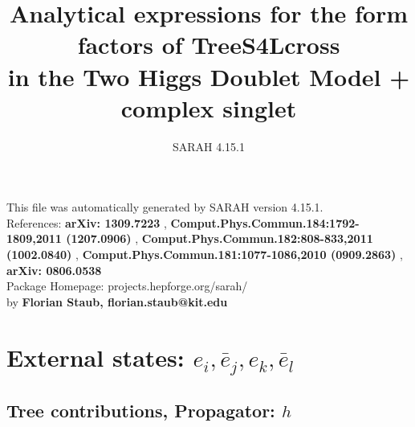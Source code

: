 \documentclass[A4,landscape]{article}
\begin{document}
\title{Analytical expressions for the form factors of TreeS4Lcross\\ in the Two Higgs Doublet Model + complex singlet } 
 \author{SARAH 4.15.1} 
 \maketitle 
 \vspace{10cm} 
This file was automatically generated by SARAH version 4.15.1.  \\ 
References: {\bf arXiv: 1309.7223 }, {\bf Comput.Phys.Commun.184:1792-1809,2011 (1207.0906) }, {\bf Comput.Phys.Commun.182:808-833,2011 (1002.0840) }, {\bf Comput.Phys.Commun.181:1077-1086,2010 (0909.2863) }, {\bf arXiv: 0806.0538 } \\ 
Package Homepage: projects.hepforge.org/sarah/ \\ 
by {\bf Florian Staub, florian.staub@kit.edu} 
 \pagebreak 
 \tableofcontents 
 \pagebreak 
\section{External states: ${e_{{i}}, \bar{e}_{{j}}, e_{{k}}, \bar{e}_{{l}}}$} 
\subsection{Tree contributions, Propagator: $h$} 
\end{document}
